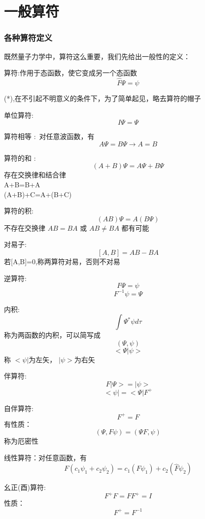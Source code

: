 \section{一般算符}

\begin{frame} [allowframebreaks=]
    \frametitle{各种算符定义}
    既然量子力学中，算符这么重要，我们先给出一般性的定义：
    \begin{definition}
        算符:作用于态函数，使它变成另一个态函数
        $$ \hat{F} \Psi=\psi$$
    \end{definition}
    (*),在不引起不明意义的条件下，为了简单起见，略去算符的帽子
    \begin{definition}
        单位算符:
        $$ I\Psi=\Psi $$
    \end{definition}
    \begin{definition}
        算符相等 : 对任意波函数，有
        $$ A\Psi=B\Psi \to A=B $$
    \end{definition}
    \begin{definition}
        算符的和 : 
        $$ (A+B)\Psi=A\Psi+B\Psi $$
        存在交换律和结合律\\
        A+B=B+A\\
        (A+B)+C=A+(B+C)
    \end{definition}
    \begin{definition}
        算符的积: 
        $$ (AB)\Psi=A(B\Psi) $$
        不存在交换律
        $AB=BA$ 或 $AB\ne BA$ 都有可能
    \end{definition}
    \begin{definition}
        对易子: 
        $$ [A,B]=AB-BA$$
        若[A,B]=0,称两算符对易，否则不对易
    \end{definition}
    \begin{definition}
        逆算符: 
        $$ F\Psi=\psi $$
        $$ F^{-1}\psi=\Psi $$
    \end{definition}
    \begin{definition}
        内积: 
        $$ \int\Psi^*\psi d \tau$$
        称为两函数的内积，可以简写成
        $$ (\Psi,\psi)$$ 
        $$ <\Psi|\psi>$$
        称 $ <\psi|$为左矢， $|\psi>$为右矢
    \end{definition} 
    \begin{definition}
        伴算符: 
        $$ F|\Psi> = |\psi> $$
        $$ <\psi| = <\Psi|F^{+} $$
    \end{definition}   
    \begin{definition}
        自伴算符: 
        $$ F^{+} = F $$
        有性质：
        $$ (\Psi,F\psi)=(\Psi F,\psi)$$ 
        称为厄密性
    \end{definition} 
    \begin{definition}
        线性算符：对任意函数，有\\
        $$F(c_1\psi_1+c_2\psi_2 ) = c_1(F\psi_1)+c_2(\hat{F}\psi_2 )$$
    \end{definition}
    \begin{definition}
        幺正(酉)算符: 
        $$ F^{+}F = FF^{+}=I $$
        性质：
        $$ F^{+}=F^{-1}$$ 
    \end{definition}         
\end{frame} 

